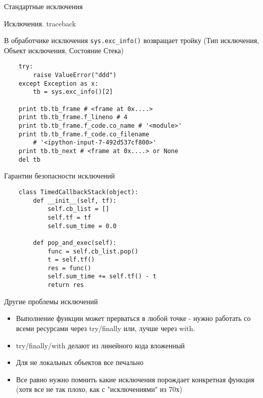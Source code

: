 \documentclass{article}
\begin{document}
\begin{center} Стандартные исключения \end{center}
\newpage

\begin{center} Исключения. traceback \end{center}
	В обработчике исключения \lstinline!sys.exc_info()! возвращает тройку
		(Тип исключения, Объект исключения, Состояние Стека)
\begin{lstlisting}
	try:
	    raise ValueError("ddd")
	except Exception as x:
		tb = sys.exc_info()[2]

	print tb.tb_frame # <frame at 0x....>
	print tb.tb_frame.f_lineno # 4
	print tb.tb_frame.f_code.co_name # '<module>'
	print tb.tb_frame.f_code.co_filename 
		# '<ipython-input-7-492d537cf800>'
	print tb.tb_next # <frame at 0x....> or None
	del tb
\end{lstlisting}
\newpage

\begin{center} Гарантии безопасности исключений \end{center}
\begin{lstlisting}
	class TimedCallbackStack(object):
		def __init__(self, tf):
			self.cb_list = []
			self.tf = tf
			self.sum_time = 0.0

		def pop_and_exec(self):
			func = self.cb_list.pop()
			t = self.tf()
			res = func()
			self.sum_time += self.tf() - t
			return res
\end{lstlisting}

\begin{center} Другие проблемы исключений \end{center}
\begin{itemize}
	\item Выполнение функции может прерваться в любой точке - нужно работать со всеми ресурсами
	      через try/finally или, лучше через with.
	\item try/finally/with делают из линейного кода вложенный
	\item Для не локальных объектов все печально
	\item Все равно нужно помнить какие исключения порождает конкретная функция
	      (хотя все не так плохо, как с "исключениями" из 70х)
\end{itemize}
\newpage

\end{document}
